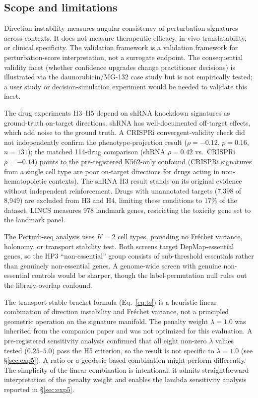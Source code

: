 \documentclass[11pt]{article}
\begin{document}
\subsection{Scope and limitations}

Direction instability measures angular consistency of perturbation signatures
across contexts. It does not measure therapeutic efficacy, in-vivo
translatability, or clinical specificity. The validation framework is a
validation framework for perturbation-score interpretation, not a surrogate
endpoint. The consequential validity facet (whether confidence upgrades
change practitioner decisions) is illustrated via the daunorubicin/MG-132
case study but is not empirically tested; a user study or
decision-simulation experiment would be needed to validate this facet.

The drug experiments H3--H5 depend on shRNA knockdown signatures as
ground-truth on-target directions. shRNA has well-documented off-target
effects, which add noise to the ground truth. A CRISPRi
convergent-validity check did not
independently confirm the phenotype-projection result ($\rho = -0.12$,
$p = 0.16$, $n = 131$); the matched 114-drug comparison (shRNA
$\rho = 0.42$ vs.\ CRISPRi $\rho = -0.14$) points to the
pre-registered K562-only confound (CRISPRi signatures from a single
cell type are poor on-target directions for drugs acting in
non-hematopoietic contexts). The shRNA H3 result stands on its original evidence without
independent reinforcement. Drugs with unannotated targets
(7{,}398 of 8{,}949) are excluded from H3 and H4, limiting these conditions
to 17\% of the dataset. LINCS measures 978 landmark genes, restricting
the toxicity gene set to the landmark panel.

The Perturb-seq analysis uses $K = 2$ cell types, providing no Fr\'echet
variance, holonomy, or transport stability test. Both screens target
DepMap-essential genes, so the HP3 ``non-essential'' group consists of
sub-threshold essentials rather than genuinely non-essential genes. A
genome-wide screen with genuine non-essential controls would be sharper,
though the label-permutation null rules out the library-overlap confound.

The transport-stable bracket formula (Eq.~\ref{eq:ts}) is a heuristic
linear combination of direction instability and Fr\'echet variance, not a
principled geometric operation on the signature manifold. The penalty
weight $\lambda = 1.0$ was inherited from the companion paper
\citep{tower2026drug} and was not optimized for this evaluation. A
pre-registered sensitivity analysis confirmed that all eight non-zero
$\lambda$ values tested ($0.25$--$5.0$) pass the H5 criterion, so the
result is not specific to $\lambda = 1.0$ (see \S\ref{sec:exp5}).
A ratio or a geodesic-based combination might perform differently.
The simplicity of the linear combination is intentional: it admits
straightforward interpretation of the penalty weight and enables the
lambda sensitivity analysis reported in \S\ref{sec:exp5}.
\end{document}

